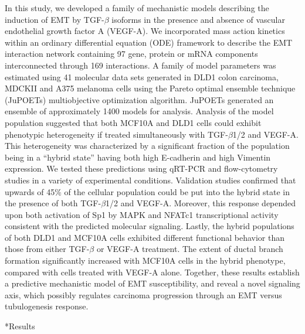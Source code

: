 \documentclass[12pt]{article}
\makeatletter
\renewcommand\section{\@startsection
	{subsection}{2}{0mm}
	{-0.2in}
	{0.05\baselineskip}
	{\normalfont\large\bfseries}}
\makeatother
\begin{document}
In this study, we developed a family of mechanistic models describing the induction of EMT by TGF-$\beta$ isoforms in the presence and absence of vascular endothelial growth factor A (VEGF-A).
We incorporated mass action kinetics within an ordinary differential equation (ODE) framework to describe the EMT interaction network containing 97 gene, protein or mRNA components interconnected through 169 interactions.
A family of model parameters was estimated using 41 molecular data sets generated in DLD1 colon carcinoma, MDCKII and A375 melanoma cells using the Pareto optimal ensemble technique (JuPOETs) multiobjective optimization algorithm.
JuPOETs generated an ensemble of approximately 1400 models for analysis.
Analysis of the model population suggested that both MCF10A and DLD1 cells could exhibit phenotypic heterogeneity if treated simultaneously with TGF-$\beta$1/2 and VEGF-A.
This heterogeneity was characterized by a significant fraction of the population being in a “hybrid state” having both high E-cadherin and high Vimentin expression.
We tested these predictions using qRT-PCR and flow-cytometry studies in a variety of experimental conditions.
Validation studies confirmed that upwards of 45\% of the cellular population could be put into the hybrid state in the presence of both TGF-$\beta$1/2 and VEGF-A.
Moreover, this response depended upon both activation of Sp1 by MAPK and NFATc1 transcriptional activity consistent with the predicted molecular signaling.
Lastly, the hybrid populations of both DLD1 and MCF10A cells exhibited different functional behavior than those from either TGF-$\beta$ or VEGF-A treatment.
The extent of ductal branch formation significantly increased with MCF10A cells in the hybrid phenotype, compared with cells treated with VEGF-A alone.
Together, these results establish a predictive mechanistic model of EMT susceptibility, and reveal a novel signaling axis, which possibly regulates carcinoma progression through an EMT versus tubulogenesis response.

\clearpage

\section*{Results}
\end{document}
